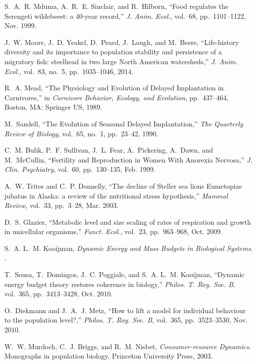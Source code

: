 \documentclass[11pt]{article}
\begin{document}
\begin{multicols}{2}
{\begin{thebibliography}{10}
S.~A.~R. Mduma, A.~R.~E. Sinclair, and R.~Hilborn, ``{Food regulates the
  Serengeti wildebeest: a 40-year record},'' {\em J. Anim. Ecol.}, vol.~68,
  pp.~1101--1122, Nov. 1999.

J.~W. Moore, J.~D. Yeakel, D.~Peard, J.~Lough, and M.~Beere, ``{Life-history
  diversity and its importance to population stability and persistence of a
  migratory fish: steelhead in two large North American watersheds},'' {\em J.
  Anim. Ecol.}, vol.~83, no.~5, pp.~1035--1046, 2014.

R.~A. Mead, ``{The Physiology and Evolution of Delayed Implantation in
  Carnivores},'' in {\em Carnivore Behavior, Ecology, and Evolution},
  pp.~437--464, Boston, MA: Springer US, 1989.

M.~Sandell, ``{The Evolution of Seasonal Delayed Implantation},'' {\em The
  Quarterly Review of Biology}, vol.~65, no.~1, pp.~23--42, 1990.

C.~M. Bulik, P.~F. Sullivan, J.~L. Fear, A.~Pickering, A.~Dawn, and
  M.~McCullin, ``{Fertility and Reproduction in Women With Anorexia Nervosa},''
  {\em J. Clin. Psychiatry}, vol.~60, pp.~130--135, Feb. 1999.

A.~W. Trites and C.~P. Donnelly, ``{The decline of Steller sea lions Eumetopias
  jubatus in Alaska: a review of the nutritional stress hypothesis},'' {\em
  Mammal Review}, vol.~33, pp.~3--28, Mar. 2003.

D.~S. Glazier, ``{Metabolic level and size scaling of rates of respiration and
  growth in unicellular organisms},'' {\em Funct. Ecol.}, vol.~23,
  pp.~963--968, Oct. 2009.

S.~A. L.~M. Kooijman, {\em {Dynamic Energy and Mass Budgets in Biological
  Systems}}.
.

T.~Sousa, T.~Domingos, J.~C. Poggiale, and S.~A. L.~M. Kooijman, ``{Dynamic
  energy budget theory restores coherence in biology},'' {\em Philos. T. Roy.
  Soc. B}, vol.~365, pp.~3413--3428, Oct. 2010.

O.~Diekmann and J.~A.~J. Metz, ``{How to lift a model for individual behaviour
  to the population level?},'' {\em Philos. T. Roy. Soc. B}, vol.~365,
  pp.~3523--3530, Nov. 2010.

W.~W. Murdoch, C.~J. Briggs, and R.~M. Nisbet, {\em {Consumer-resource
  Dynamics}}.
\newblock Monographs in population biology, Princeton University Press, 2003.


\end{thebibliography}}
\end{multicols}
\end{document}
